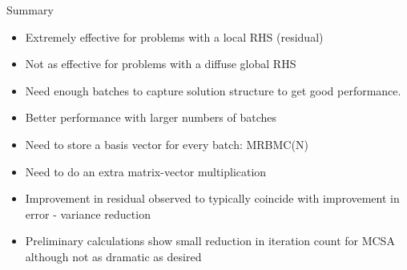 \documentclass{beamer}
\begin{document}
\begin{frame}{Summary}

  \begin{itemize}
  \item Extremely effective for problems with a local RHS (residual)
  \item Not as effective for problems with a diffuse global RHS
  \item Need enough batches to capture solution structure to get good
    performance.
  \item Better performance with larger numbers of batches
  \item Need to store a basis vector for every batch: MRBMC(N)
  \item Need to do an extra matrix-vector multiplication
  \item Improvement in residual observed to typically coincide with
    improvement in error - variance reduction
  \item Preliminary calculations show small reduction in iteration
    count for MCSA although not as dramatic as desired
  \end{itemize}

\end{frame}

\end{document}
